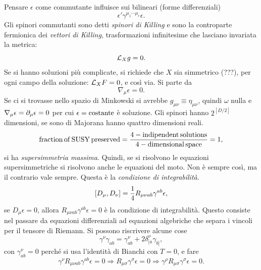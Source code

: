 Pensare $\epsilon$ come commutante influisce sui bilineari (forme differenziali)
\begin{equation}
    \epsilon'\gamma^{\mu_1\cdots \mu_r}\epsilon.
\end{equation}
Gli spinori commutanti sono detti \emph{spinori di Killing} e sono la controparte fermionica dei \emph{vettori di Killing}, trasformazioni infinitesime che lasciano invariata la metrica:
\begin{equation}
    \mathcal{L}_X g = 0.
\end{equation}
Se si hanno soluzioni più complicate, si richiede che $X$ sia simmetrico (???), per ogni campo della soluzione: $\mathcal{L}_X F = 0$, e così via. Si parte da 
\begin{equation}
    \nabla_\mu \epsilon = 0.
\end{equation}
Se ci si trovasse nello spazio di Minkowski si avrebbe $g_{\mu\nu} \equiv \eta_{\mu\nu}$, quindi $\omega$ nulla e $\nabla_\mu \epsilon = \partial_\mu \epsilon = 0$ per cui $\epsilon = \mathrm{costante}$ è soluzione. Gli spinori hanno $2^{[D/2]}$ dimensioni, se sono di Majorana hanno quattro dimensioni reali. 
\begin{equation}
    \mathrm{fraction\,of\,SUSY\,preserved} = \frac{\mathrm{4-indipendent\,solutions}}{\mathrm{4-dimensional\,space}} = 1,
\end{equation}
si ha \emph{supersimmetria massima}. Quindi, se si risolvono le equazioni supersimmetriche si risolvono anche le equazioni del moto. Non è sempre così, ma il contrario vale sempre. Questa è la \emph{condizione di integrabilità}. 
\begin{equation}
    [D_\mu,D_\nu] = \frac{1}{4}R_{\mu\nu ab}\gamma^{ab}\epsilon,
\end{equation} 
se $D_\mu \epsilon = 0$, allora $R_{\mu\nu ab}\gamma^{ab}\epsilon = 0$ è la condizione di integrabilità. Questo consiste nel passare da equazioni differenziali ad equazioni algebriche che separa i vincoli per il tensore di Riemann. Si possono riscrivere alcune cose 
\begin{equation}
    \gamma^\nu\gamma_{ab} = \gamma^\nu_{ab} + 2\delta^\nu_{[a}\gamma_{b]},
\end{equation} 
con $\gamma^\nu_{ab} = 0$ perché si usa l'identità di Bianchi con $T = 0$, e fare
\begin{equation}
    \gamma^\nu R_{\mu\nu ab}\gamma^{ab}\epsilon = 0 \Longrightarrow R_{\mu\sigma}\gamma^\sigma \epsilon = 0 \Longrightarrow \gamma^\rho R_{\mu\sigma} \gamma^\sigma \epsilon = 0.
\end{equation}
